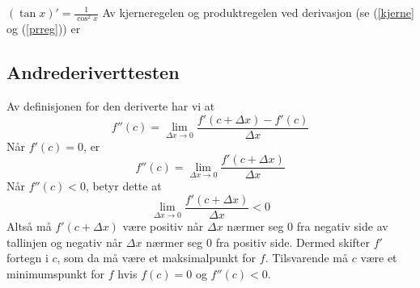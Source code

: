 {\boldmath $ (\tan x)'=\frac{1}{\cos^2 x} $}\bs
Av kjerneregelen og produktregelen ved derivasjon (se (\ref{kjerne} og (\ref{prreg})) er

\subsection*{Andrederiverttesten}
Av definisjonen for den deriverte har vi at
\[ f''(c)=\lim\limits_{\Delta x \to 0}\frac{f'(c+\Delta x)-f'(c)}{\Delta x} \]
Når $ f'(c)=0$, er
\[ f''(c)=\lim\limits_{\Delta x \to 0}\frac{f'(c+\Delta x)}{\Delta x} \]
Når $ f''(c)<0 $, betyr dette at
\[\lim\limits_{\Delta x \to 0} \frac{f'(c+\Delta x)}{\Delta x}<0 \]
Altså må $ f'(c+\Delta x) $ være positiv når $ \Delta x $ nærmer seg 0 fra negativ side av tallinjen og negativ når $ \Delta x $ nærmer seg 0 fra positiv side. Dermed skifter $ f' $ fortegn i $ c $, som da må være et maksimalpunkt for $ f $. Tilsvarende må $ c $ være et minimumspunkt for $ f $ hvis $ {f(c)=0} $ og $ {f''(c)<0} $.
\begin{comment}
Kommentering av ligninger.
\begin{flalign}
& & (a+b)^2&=a^2+2ab+b^2 && \llap{Right justify me!}
\end{flalign}
\subsection*{Infleksjonspunkt}
For å argumentere for at $ f $ går fra konkav/konveks til konveks/konkav i et vendepunkt skal vi bruke følgende teorem:

\textsl{Hvis $ f' $ er økende på et intervall, er $ f $ konveks på dette intervallet. Hvis $ f' $ er synkende på et intervall, er $ f $ konkav på dette intervallet.}

Konkave og konvekse funksjoner er en marginal del av R2-faget, derfor nøyer vi oss med grafen til $ f(x)=\sin x $ og $ f'(x) $ som overbevisning om teoremets gyldighet:
\begin{figure}
\centering
\texttt{[image: \\asym\{konk2]}}
\caption{Grafen til $ f(x)=\sin x $ og $ f'(x)=\cos x $. $ f $ er konkav i intervallet til venstre og konveks i intervallet til høyre.}
\end{figure}
Siden $ f' $ er voksende når $ f''>0 $ og synkende når $ f''<0 $, følger det direkte av teoremet over at $ f $ går fra konveks til konkav når $ f'' $ går fra positiv til negativ, og fra konkav til konveks når $ f'' $ går fra negativ til positiv. For kontinuerlig funksjoner betyr dette at $ f''=0 $ i et infleksjonspunkt, men legg merke til at $ f''(c)=0 $ ikke nødvendigvis betyr at $ f'' $ skifter fortegn i $ c $.


\end{comment}


